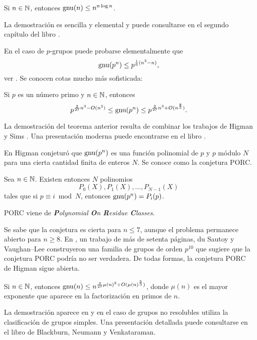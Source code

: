 \begin{theorem}
Si $n\in\mathbb{N}$, entonces $\operatorname{gnu}(n)\leq n^{n\log n}$.
\end{theorem}

La demostración es sencilla y elemental y puede consultarse en el segundo 
capítulo del libro \cite{MR2382539}. 

En el caso de $p$-grupos puede probarse elementalmente que 
\[
\operatorname{gnu}(p^n)\leq p^{\frac16(n^3-n)},
\]
ver \cite[Theorem 5.1]{MR2382539}. Se conocen 
cotas mucho más sofisticada: 

\begin{theorem}
Si $p$ es un número primo y $n\in\mathbb{N}$, entonces 
\[
p^{\frac{2}{27}n^3-O(n^2)}\leq\operatorname{gnu}(p^n)\leq p^{\frac{2}{27}n^3+O(n^{\frac{8}{3}})}.
\]
\end{theorem}

La demostración del teorema anterior resulta de combinar los trabajos de Higman \cite{MR113948} 
y Sims \cite{MR169921}. Una presentación moderna puede encontrarse en el libro
\cite{MR2382539}. 

En \cite{MR123605} Higman conjeturó 
que $\operatorname{gnu}(p^n)$ es una función polinomial de $p$ y $p$ módulo $N$ para una cierta
cantidad finita de enteros $N$. Se conoce como la conjetura PORC.

\begin{conjecture}[Higman]
Sea $n\in\mathbb{N}$. Existen entonces $N$ polinomios 
\[
P_{0}(X),P_{1}(X),\dots,P_{N-1}(X)
\]
tales que
si $p\equiv i\bmod N$, entonces $\operatorname{gnu}(p^n)=P_{i}(p)$. 
\end{conjecture}

PORC viene de \emph{\textbf{P}olynomial \textbf{O}n \textbf{R}esidue \textbf{C}lasses}. 

Se sabe que la conjetura es cierta para $n\leq7$, aunque el problema permanece abierto para $n\geq8$. 
En \cite{MR2921623}, un trabajo de más de setenta páginas, 
du Sautoy y Vaughan--Lee construyeron una familia de grupos
de orden $p^{10}$ que sugiere que la conjetura PORC podría no ser verdadera. De todas formas, la conjetura
PORC de Higman sigue abierta. 

\begin{theorem}[Pyber]
Si $n\in\mathbb{N}$, entonces 
$\operatorname{gnu}(n)\leq n^{\frac{2}{27}\mu(n)^2+O(\mu(n)^{\frac{5}{3}})}$, donde $\mu(n)$ es el mayor exponente
que aparece en la factorización en primos de $n$. 
\end{theorem}

La demostración aparece en \cite{MR1200081} y en el caso de grupos no resolubles utiliza la clasificación de grupos simples. Una presentación detallada puede consultarse en el libro 
\cite{MR2382539} de Blackburn, Neumann y Venkataraman.

